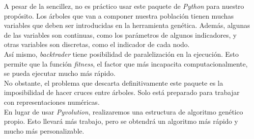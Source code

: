     A pesar de la sencillez, no es pr\'actico usar este paquete de \textit{Python} para nuestro prop\'osito. Los \'arboles que van a componer nuestra poblaci\'on tienen muchas variables que deben ser introducidas en la herramienta gen\'etica. Adem\'as, algunas de las variables son continuas, como los par\'ametros de algunos indicadores, y otras variables son discretas, como el indicador de cada nodo.\\
    
    As\'i mismo, \textit{backtrader} tiene posibilidad de paralelizaci\'on en la ejecuci\'on. Esto permite que la funci\'on \textit{fitness}, el factor que m\'as incapacita computacionalmente, se pueda ejecutar mucho m\'as r\'apido.\\
    
    No obstante, el problema que descarta definitivamente este paquete es la imposibilidad de hacer cruces entre \'arboles. Solo est\'a preparado para trabajar con representaciones num\'ericas.\\
    
    En lugar de usar \textit{Pyvolution}, realizaremos una estructura de algoritmo gen\'etico propio. Esto llevar\'a m\'as trabajo, pero se obtendr\'a un algoritmo m\'as r\'apido y mucho m\'as personalizable.\\